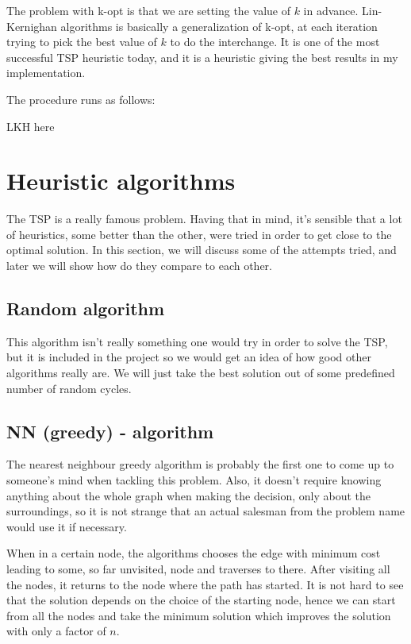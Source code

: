 \documentclass[12pt,twoside,notitlepage]{report}
\begin{document}
The problem with k-opt is that we are setting the value of $k$ in advance. Lin-Kernighan algorithms is basically a generalization of k-opt, at each iteration trying to pick the best value of $k$ to do the interchange. It is one of the most successful TSP heuristic today, and it is a heuristic giving the best results in my implementation.

The procedure runs as follows:

LKH here

\section{Heuristic algorithms}

The TSP is a really famous problem. Having that in mind, it's sensible that a lot of heuristics, some better than the other, were tried in order to get close to the optimal solution. In this section, we will discuss some of the attempts tried, and later we will show how do they compare to each other.

\subsection{Random algorithm}

This algorithm isn't really something one would try in order to solve the TSP, but it is included in the project so we would get an idea of how good other algorithms really are. We will just take the best solution out of some predefined number of random cycles.

\subsection{NN (greedy) - algorithm}

The nearest neighbour greedy algorithm is probably the first one to come up to someone's mind when tackling this problem. Also, it doesn't require knowing anything about the whole graph when making the decision, only about the surroundings, so it is not strange that an actual salesman from the problem name would use it if necessary. 

\smallskip

When in a certain node, the algorithms chooses the edge with minimum cost leading to some, so far unvisited, node and traverses to there. After visiting all the nodes, it returns to the node where the path has started. It is not hard to see that the solution depends on the choice of the starting node, hence we can start from all the nodes and take the minimum solution which improves the solution with only a factor of $n$. 
\end{document}
